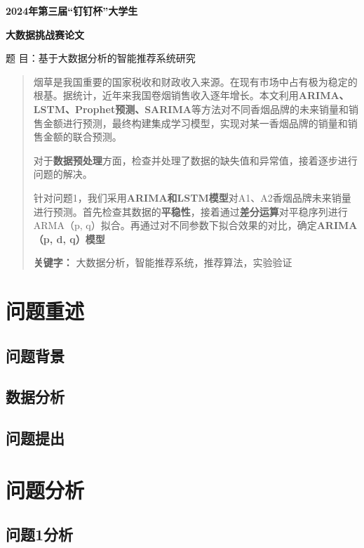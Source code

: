 \documentclass{article}
\begin{document}
  
	
	\begin{center}  
		\fontsize{16pt}{19pt}\selectfont \textbf{2024年第三届“钉钉杯”大学生}  
		
		\fontsize{16pt}{19pt}\selectfont  
		\textbf{大数据挑战赛论文}  
		
		\centering  
		题 目：基于大数据分析的智能推荐系统研究  
	\end{center}  
	
	\begin{abstract}  
		烟草是我国重要的国家税收和财政收入来源。在现有市场中占有极为稳定的根基。据统计，近年来我国卷烟销售收入逐年增长。本文利用\textbf{ARIMA、LSTM、Prophet预测、SARIMA}等方法对不同香烟品牌的未来销量和销售金额进行预测，最终构建集成学习模型，实现对某一香烟品牌的销量和销售金额的联合预测。
		
		对于\textbf{数据预处理}方面，检查并处理了数据的缺失值和异常值，接着逐步进行问题的解决。
		
		针对问题1，我们采用\textbf{ARIMA和LSTM模型}对A1、A2香烟品牌未来销量进行预测。首先检查其数据的\textbf{平稳性}，接着通过\textbf{差分运算}对平稳序列进行ARMA（p, q）拟合。再通过对不同参数下拟合效果的对比，确定\textbf{ARIMA（p, d, q）模型}
		
		\textbf{关键字：} 大数据分析，智能推荐系统，推荐算法，实验验证  
	\end{abstract}  
	\newpage  
	
	\tableofcontents  
	\newpage 
	
	\pagestyle{mainmatter}
	\setcounter{page}{1}
	\section{问题重述}
	\subsection{问题背景}
	\subsection{数据分析}
	\subsection{问题提出}  
	\section{问题分析}  
	\subsection{问题1分析}
\end{document}
